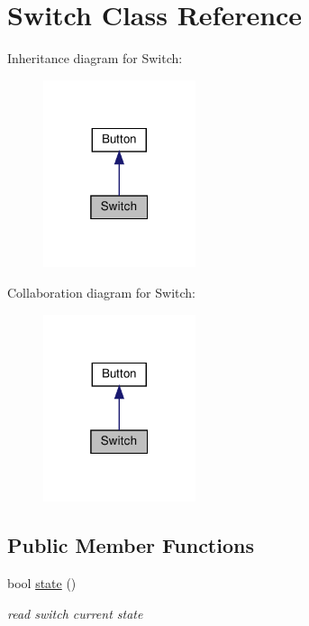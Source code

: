 \hypertarget{class_switch}{}\section{Switch Class Reference}
\label{class_switch}


Inheritance diagram for Switch\+:\nopagebreak
\begin{figure}[H]
\begin{center}
\leavevmode
\includegraphics[width=127pt]{class_switch__inherit__graph}
\end{center}
\end{figure}


Collaboration diagram for Switch\+:\nopagebreak
\begin{figure}[H]
\begin{center}
\leavevmode
\includegraphics[width=127pt]{class_switch__coll__graph}
\end{center}
\end{figure}
\subsection*{Public Member Functions}
\begin{DoxyCompactItemize}
\item 
bool \hyperlink{class_switch_ac9b4369bd630f9d975f2bd82933f7cc6}{state} ()
\begin{DoxyCompactList}\small\item\em read switch current state \end{DoxyCompactList}\end{DoxyCompactItemize}


